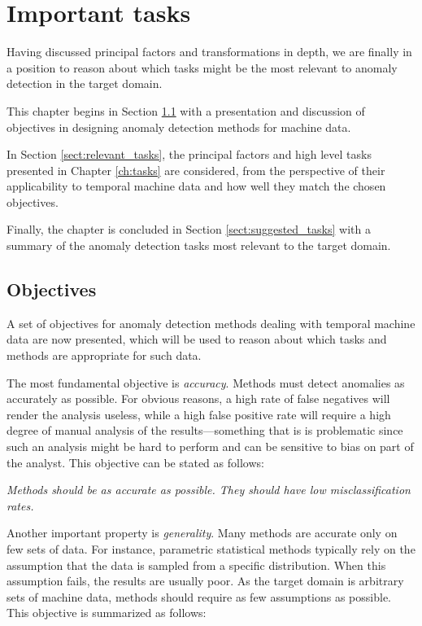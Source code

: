 \chapter{Important tasks}
\label{ch:problems}

Having discussed principal factors and transformations in depth, we are finally in a position to reason about which tasks might be the most relevant to anomaly detection in the target domain.

This chapter begins in Section \ref{sect:goals} with a presentation and discussion of objectives in designing anomaly detection methods for machine data.

In Section \ref{sect:relevant_tasks}, the principal factors and high level tasks presented in Chapter \ref{ch:tasks} are considered, from the perspective of their applicability to temporal machine data and how well they match the chosen objectives.

Finally, the chapter is concluded in Section \ref{sect:suggested_tasks} with a summary of the anomaly detection tasks most relevant to the target domain.

\section{Objectives}
\label{sect:goals}

A set of objectives for anomaly detection methods dealing with temporal machine data are now presented, which will be used to reason about which tasks and methods are appropriate for such data.

The most fundamental objective is \emph{accuracy}. Methods must detect anomalies as accurately as possible. For obvious reasons, a high rate of false negatives will render the analysis useless, while a high false positive rate will require a high degree of manual analysis of the results---something that is is problematic since such an analysis might be hard to perform and can be sensitive to bias on part of the analyst. This objective can be stated as follows:

  \emph{Methods should be as accurate as possible. They should have low misclassification rates.}

Another important property is \emph{generality}. Many methods are accurate only on few sets of data. For instance, parametric statistical methods typically rely on the assumption that the data is sampled from a specific distribution. When this assumption fails, the results are usually poor. As the target domain is arbitrary sets of machine data, methods should require as few assumptions as possible. This objective is summarized as follows:

